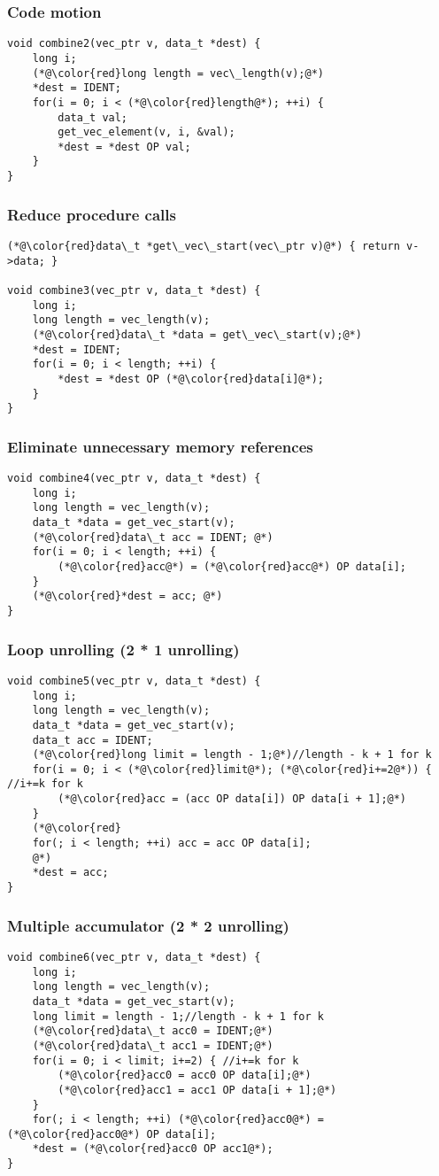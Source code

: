 \subsubsection{Code motion}
\begin{lstlisting}
void combine2(vec_ptr v, data_t *dest) {
	long i;
	(*@\color{red}long length = vec\_length(v);@*)
	*dest = IDENT;
	for(i = 0; i < (*@\color{red}length@*); ++i) {
		data_t val;
		get_vec_element(v, i, &val);
		*dest = *dest OP val;
	}
}
\end{lstlisting}
\subsubsection{Reduce procedure calls}
\begin{lstlisting}
(*@\color{red}data\_t *get\_vec\_start(vec\_ptr v)@*) { return v->data; }

void combine3(vec_ptr v, data_t *dest) {
	long i;
	long length = vec_length(v);
	(*@\color{red}data\_t *data = get\_vec\_start(v);@*)
	*dest = IDENT;
	for(i = 0; i < length; ++i) {
		*dest = *dest OP (*@\color{red}data[i]@*);
	}
}
\end{lstlisting}
\subsubsection{Eliminate unnecessary memory references}
\begin{lstlisting}
void combine4(vec_ptr v, data_t *dest) {
	long i;
	long length = vec_length(v);
	data_t *data = get_vec_start(v);
	(*@\color{red}data\_t acc = IDENT; @*)
	for(i = 0; i < length; ++i) {
		(*@\color{red}acc@*) = (*@\color{red}acc@*) OP data[i];
	}
	(*@\color{red}*dest = acc; @*)
}
\end{lstlisting}
\subsubsection{Loop unrolling (2 * 1 unrolling)}
\begin{lstlisting}
void combine5(vec_ptr v, data_t *dest) {
	long i;
	long length = vec_length(v);
	data_t *data = get_vec_start(v);
	data_t acc = IDENT;
	(*@\color{red}long limit = length - 1;@*)//length - k + 1 for k
	for(i = 0; i < (*@\color{red}limit@*); (*@\color{red}i+=2@*)) { //i+=k for k
		(*@\color{red}acc = (acc OP data[i]) OP data[i + 1];@*)
	}
	(*@\color{red}
	for(; i < length; ++i) acc = acc OP data[i]; 
	@*)
	*dest = acc;
}
\end{lstlisting}
\subsubsection{Multiple accumulator (2 * 2 unrolling)}
\begin{lstlisting}
void combine6(vec_ptr v, data_t *dest) {
	long i;
	long length = vec_length(v);
	data_t *data = get_vec_start(v);
	long limit = length - 1;//length - k + 1 for k
	(*@\color{red}data\_t acc0 = IDENT;@*)
	(*@\color{red}data\_t acc1 = IDENT;@*)
	for(i = 0; i < limit; i+=2) { //i+=k for k
		(*@\color{red}acc0 = acc0 OP data[i];@*)
		(*@\color{red}acc1 = acc1 OP data[i + 1];@*)
	}
	for(; i < length; ++i) (*@\color{red}acc0@*) = (*@\color{red}acc0@*) OP data[i]; 
	*dest = (*@\color{red}acc0 OP acc1@*);
}
\end{lstlisting}
